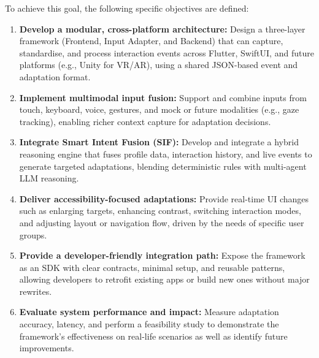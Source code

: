 \documentclass[openany]{book}
\begin{document}
To achieve this goal, the following specific objectives are defined:
\begin{enumerate}
    \item \textbf{Develop a modular, cross-platform architecture:} Design a three-layer framework (Frontend, Input Adapter, and Backend) that can capture, standardise, and process interaction events across Flutter, SwiftUI, and future platforms (e.g., Unity for VR/AR), using a shared JSON-based event and adaptation format.
    \item \textbf{Implement multimodal input fusion:} Support and combine inputs from touch, keyboard, voice, gestures, and mock or future modalities (e.g., gaze tracking), enabling richer context capture for adaptation decisions.
    \item \textbf{Integrate Smart Intent Fusion (SIF):} Develop and integrate a hybrid reasoning engine that fuses profile data, interaction history, and live events to generate targeted adaptations, blending deterministic rules with multi-agent LLM reasoning.
    \item \textbf{Deliver accessibility-focused adaptations:} Provide real-time UI changes such as enlarging targets, enhancing contrast, switching interaction modes, and adjusting layout or navigation flow, driven by the needs of specific user groups.
    \item \textbf{Provide a developer-friendly integration path:} Expose the framework as an SDK with clear contracts, minimal setup, and reusable patterns, allowing developers to retrofit existing apps or build new ones without major rewrites.
    \item \textbf{Evaluate system performance and impact:} Measure adaptation accuracy, latency, and perform a feasibility study to demonstrate the framework’s effectiveness on real-life scenarios as well as identify future improvements.
\end{enumerate}

\newpage 
\end{document}
